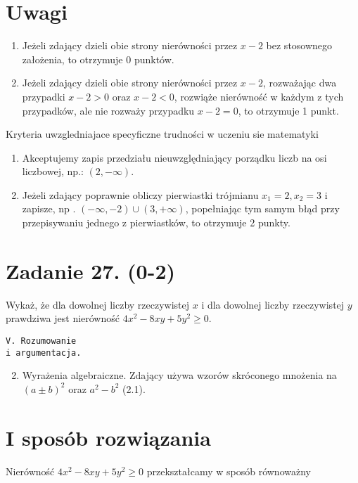\documentclass[10pt]{article}
\begin{document}
\section*{Uwagi}
\begin{enumerate}
  \item Jeżeli zdający dzieli obie strony nierówności przez $x-2$ bez stosownego założenia, to otrzymuje 0 punktów.
  \item Jeżeli zdający dzieli obie strony nierówności przez $x-2$, rozważając dwa przypadki $x-2>0$ oraz $x-2<0$, rozwiąże nierówność w każdym z tych przypadków, ale nie rozważy przypadku $x-2=0$, to otrzymuje 1 punkt.
\end{enumerate}

Kryteria uwzgledniajace specyficzne trudności w uczeniu sie matematyki

\begin{enumerate}
  \item Akceptujemy zapis przedziału nieuwzględniający porządku liczb na osi liczbowej, np.: $(2,-\infty)$.
  \item Jeżeli zdający poprawnie obliczy pierwiastki trójmianu $x_{1}=2, x_{2}=3$ i zapisze, np . $(-\infty,-2) \cup(3,+\infty)$, popełniając tym samym błąd przy przepisywaniu jednego z pierwiastków, to otrzymuje 2 punkty.
\end{enumerate}

\section*{Zadanie 27. (0-2)}
Wykaż, że dla dowolnej liczby rzeczywistej $x$ i dla dowolnej liczby rzeczywistej $y$ prawdziwa jest nierówność $4 x^{2}-8 x y+5 y^{2} \geq 0$.

\begin{verbatim}
V. Rozumowanie
i argumentacja.
\end{verbatim}

\begin{enumerate}
  \setcounter{enumi}{1}
  \item Wyrażenia algebraiczne. Zdający używa wzorów skróconego mnożenia na $(a \pm b)^{2}$ oraz $a^{2}-b^{2}$ (2.1).
\end{enumerate}

\section*{I sposób rozwiązania}
Nierówność $4 x^{2}-8 x y+5 y^{2} \geq 0$ przekształcamy w sposób równoważny
\end{document}
